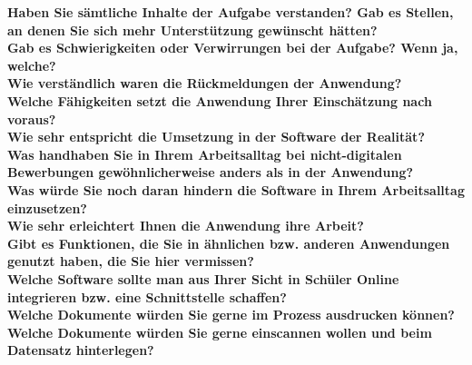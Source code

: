 \textbf{Haben Sie sämtliche Inhalte der Aufgabe verstanden? Gab es Stellen, an denen Sie sich mehr Unterstützung gewünscht hätten?}\\

\textbf{Gab es Schwierigkeiten oder Verwirrungen bei der Aufgabe? Wenn ja, welche?}\\

\textbf{Wie verständlich waren die Rückmeldungen der Anwendung?}\\

\textbf{Welche Fähigkeiten setzt die Anwendung Ihrer Einschätzung nach voraus?}\\

\textbf{Wie sehr entspricht die Umsetzung in der Software der Realität?}\\

\textbf{Was handhaben Sie in Ihrem Arbeitsalltag bei nicht-digitalen Bewerbungen gewöhnlicherweise anders als in der Anwendung?}\\

\textbf{Was würde Sie noch daran hindern die Software in Ihrem Arbeitsalltag einzusetzen?}\\

\textbf{Wie sehr erleichtert Ihnen die Anwendung ihre Arbeit?}\\

\textbf{Gibt es Funktionen, die Sie in ähnlichen bzw. anderen Anwendungen genutzt haben, die Sie hier vermissen?}\\

\textbf{Welche Software sollte man aus Ihrer Sicht in Schüler Online integrieren bzw. eine Schnittstelle schaffen?}\\

\textbf{Welche Dokumente würden Sie gerne im Prozess ausdrucken können?}\\

\textbf{Welche Dokumente würden Sie gerne einscannen wollen und beim Datensatz hinterlegen?}\\